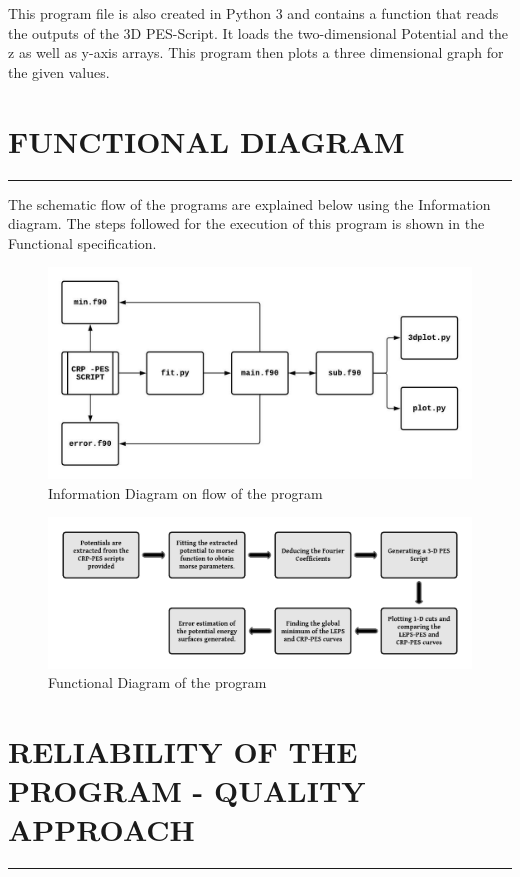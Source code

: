 \documentclass[12pt]{article}
\begin{document}
This program file is also created in Python 3 and contains a function that reads the outputs of the 3D PES-Script. It loads the two-dimensional Potential and the z as well as y-axis arrays. This program then plots a three dimensional graph for the given values.

\section{FUNCTIONAL DIAGRAM}
\par\noindent\rule{\textwidth}{0.4pt}

The schematic flow of the programs are explained below using the Information diagram. The steps followed for the execution of this program is shown in the Functional specification.

\begin{figure}[h!]
    \centering
    \includegraphics[width = \textwidth]{flow.jpeg}
    \caption{Information Diagram on flow of the program}
    \label{fig:1}
\end{figure}

\begin{figure}[h!]
    \centering
    \includegraphics[width = \textwidth]{fndiag.pdf}
    \caption{Functional Diagram of the program} 
    \label{fig:2}
\end{figure}    

\section{RELIABILITY OF THE PROGRAM - QUALITY APPROACH}
\par\noindent\rule{\textwidth}{0.4pt}
\end{document}
